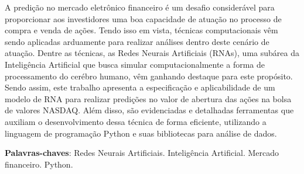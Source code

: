 \begin{resumo}[RESUMO]	
A predição no mercado eletrônico financeiro é um desafio considerável para proporcionar aos investidores uma boa capacidade de atuação no processo de compra e venda de ações. Tendo isso em vista, técnicas computacionais vêm sendo aplicadas arduamente para realizar análises dentro deste cenário de atuação. Dentre as técnicas, as Redes Neurais Artificiais (RNAs), uma subárea da Inteligência Artificial que busca simular computacionalmente a forma de processamento do cerébro humano, vêm ganhando destaque para este propósito. Sendo assim, este trabalho apresenta a especificação e aplicabilidade de um modelo de RNA para realizar predições no valor de abertura das ações na bolsa de valores NASDAQ. Além disso, são evidenciadas e detalhadas ferramentas que auxiliam o desenvolvimento dessa técnica de forma eficiente, utilizando a linguagem de programação Python e suas bibliotecas para análise de dados.

\vspace{\onelineskip}
    
\noindent
\textbf{Palavras-chaves}: Redes Neurais Artificiais. Inteligência Artificial. Mercado financeiro. Python.
\end{resumo}
